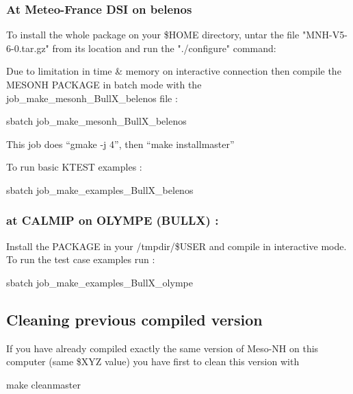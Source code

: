 \subsubsection{At Meteo-France DSI on belenos}

To install the whole package on your \$HOME directory, untar the file "MNH-V5-6-0.tar.gz" from its location and run the "./configure" command:

Due to limitation in time & memory on interactive connection then compile the MESONH PACKAGE in batch mode with the job\_make\_mesonh\_BullX\_belenos file :
\begin{bashcode}
sbatch job_make_mesonh_BullX_belenos
\end{bashcode}

This job does ``gmake -j 4'', then ``make installmaster''

To run basic KTEST examples :
\begin{bashcode}
sbatch job_make_examples_BullX_belenos
\end{bashcode}
 
\subsubsection{at CALMIP on OLYMPE (BULLX)  :}

Install the PACKAGE in your /tmpdir/\$USER and compile in interactive mode. \\

To run the test case examples  run :
\begin{bashcode}
sbatch job_make_examples_BullX_olympe
\end{bashcode}

\subsection{Cleaning previous compiled version}

If you have already compiled exactly the same version of Meso-NH on this computer (same \$XYZ value) you have first to clean this version with
\begin{bashcode}
make cleanmaster
\end{bashcode}

